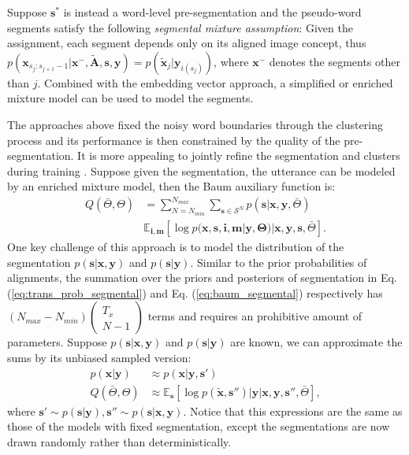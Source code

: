 \documentclass[journal]{IEEEtran}
\begin{document}
Suppose $\mathbf s^*$ is instead a word-level pre-segmentation and the pseudo-word segments satisfy the following \textit{segmental mixture assumption}: Given the assignment, each segment depends only on its aligned image concept, thus $p(\mathbf x_{s_j:s_{j+1}-1}|\mathbf x^{-}, \tilde{\mathbf{A}}, \mathbf s, \mathbf y) = p(\tilde{\mathbf x}_j|\mathbf y_{i(s_j)})$, where $\mathbf x^-$ denotes the segments other than $j$. Combined with the embedding vector approach, a simplified or enriched mixture model can be used to model the segments.

The approaches above fixed the noisy word boundaries through the clustering process and its performance is then constrained by the quality of the pre-segmentation. It is more appealing to jointly refine the segmentation and clusters during training \cite{Kamper2017}. Suppose given the segmentation, the utterance can be modeled by an enriched mixture model, then the Baum auxiliary function is:
\begin{align}\label{eq:baum_segmental}
    Q(\bar{\Theta}, \Theta) &= \sum_{N=N_{min}}^{N_{max}}\sum_{\mathbf s \in \mathcal S^N}p(\mathbf s|\mathbf x, \mathbf y, \bar{\Theta})\nonumber\\
    &\mathbb{E}_{\mathbf i, \mathbf m}\left[\log p(\mathbf x, \mathbf s, \mathbf i, \mathbf m|\mathbf y, \mathbf \Theta)|\mathbf x, \mathbf y, \mathbf s , \bar{\Theta}\right].
\end{align}
One key challenge of this approach is to model the distribution of the segmentation $p(\mathbf s|\mathbf x, \mathbf y)$ and $p(\mathbf s|\mathbf y)$. Similar to the prior probabilities of alignments, the summation over the priors and posteriors of segmentation in Eq. (\ref{eq:trans_prob_segmental}) and Eq. (\ref{eq:baum_segmental}) respectively has $(N_{max}-N_{min})\left(\begin{array}{c}
      T_x\\
     N-1
\end{array}\right)$ terms and requires an prohibitive amount of parameters. Suppose $p(\mathbf s|\mathbf x, \mathbf y)$ and $p(\mathbf s|\mathbf y)$ are known, we can approximate the sums by its unbiased sampled version:
\begin{align}\label{eq:baum-besgmm-sampled}
    p(\mathbf x|\mathbf y) &\approx p(\mathbf x|\mathbf y, \mathbf s')\\
    Q(\bar{\Theta}, \Theta) &\approx \mathbb{E}_{\mathbf s}\left[\log p(\tilde{\mathbf x}, \mathbf s'')|\mathbf y|\mathbf x, \mathbf y, \mathbf s'', \bar{\Theta}\right],
\end{align}
where $\mathbf s' \sim p(\mathbf s|\mathbf y), \mathbf s'' \sim p(\mathbf s|\mathbf x, \mathbf y)$. Notice that this expressions are the same as those of the models with fixed segmentation, except the segmentations are now drawn randomly rather than deterministically.
\end{document}
